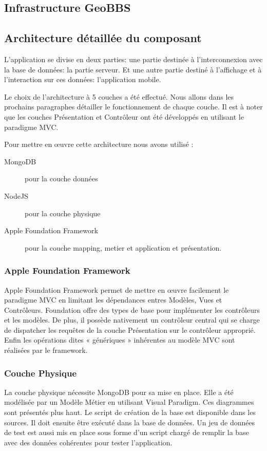 \documentclass[a4paper,12pt]{report}
\begin{document}
\begin{onehalfspace}
\chapter{Infrastructure GeoBBS}
\section{Architecture détaillée du composant}
L'application se divise en deux parties: une partie destinée à l'interconnexion avec la base de données: la partie serveur. Et une autre partie destiné à l'affichage et à l'interaction sur ces données: l'application mobile.

Le choix de l’architecture à 5 couches a été effectué. Nous allons dans les prochains paragraphes détailler le fonctionnement de chaque couche. Il est à noter que les couches Présentation et Contrôleur ont été développés en utilisant le paradigme MVC.


Pour mettre en œuvre cette architecture nous avons utilisé :
\begin{description}
  \item[MongoDB] pour la couche données
  \item[NodeJS] pour la couche physique
  \item[Apple Foundation Framework] pour la couche mapping, metier et application et présentation.
\end{description}

\subsection{Apple Foundation Framework}
  Apple Foundation Framework permet de mettre en œuvre facilement le paradigme MVC en limitant les dépendances entres Modèles, Vues et Contrôleurs. Foundation offre des types de base pour implémenter les contrôleurs et les modèles. De plus, il possède nativement un contrôleur central qui se charge de dispatcher les requêtes de la couche Présentation sur le contrôleur approprié. Enfin les opérations dites « génériques » inhérentes au modèle MVC sont réalisées par le framework.

\subsection{Couche Physique}
  La couche physique nécessite MongoDB pour sa mise en place. Elle a été modélisée par un Modèle Métier en utilisant Visual Paradigm. Ces diagrammes sont présentés plus haut. Le script de création de la base est disponible dans les sources. Il doit ensuite être exécuté dans la base de données. Un jeu de données de test est aussi mis en place sous forme d’un script chargé de remplir la base avec des données cohérentes pour tester l’application.
  

\end{onehalfspace}
\end{document}
